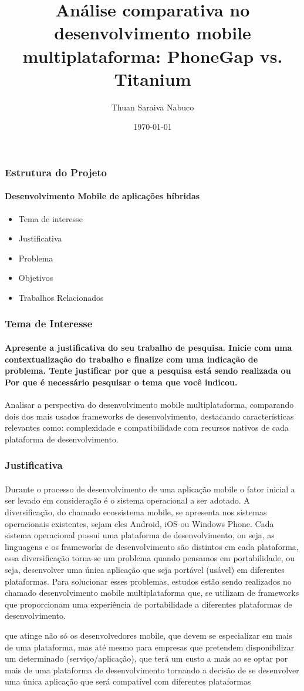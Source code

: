 \documentclass{beamer}
\title{Análise comparativa no desenvolvimento mobile multiplataforma: PhoneGap vs. Titanium}
\author{Thuan Saraiva Nabuco}
\institute{Universidade Estadual do Ceará}
\date{\today}
\begin{document}
\titlepage
\begin{frame}
	\frametitle{Estrutura do Projeto}
	\framesubtitle{Desenvolvimento Mobile de aplicações híbridas}
	\begin{itemize}
		\item Tema de interesse
		\item Justificativa
		\item Problema
		\item Objetivos
		\item Trabalhos Relacionados
	\end{itemize}
\end{frame}

\begin{frame}
	\frametitle{Tema de Interesse}
	\framesubtitle{Apresente a justificativa do seu trabalho de pesquisa. Inicie com uma contextualização do trabalho e finalize com uma indicação de problema. Tente justificar por que a pesquisa está sendo realizada ou Por que é necessário pesquisar o tema que você indicou.}
	Analisar a perspectiva do desenvolvimento mobile multiplataforma, comparando dois dos mais usados frameworks de desenvolvimento, destacando características relevantes como: complexidade e compatibilidade com recursos nativos de cada plataforma de desenvolvimento.
\end{frame}

\begin{frame}
	\frametitle{Justificativa}
	\framesubtitle{}
	Durante o processo de desenvolvimento de uma aplicação mobile o fator inicial a ser levado em consideração é o sistema operacional a ser adotado. A diversificação, do chamado ecossistema mobile, se apresenta nos sistemas operacionais existentes, sejam eles Android, iOS ou Windows Phone. Cada sistema operacional possui uma plataforma de desenvolvimento, ou seja, as linguagens e os frameworks de desenvolvimento são distintos em cada plataforma, essa diversificação torna-se um problema quando pensamos em portabilidade, ou seja, desenvolver uma única aplicação que seja portável (usável) em diferentes plataformas. Para solucionar esses problemas, estudos estão sendo realizados no chamado desenvolvimento mobile multiplataforma que, se utilizam de frameworks que proporcionam uma experiência de portabilidade a diferentes plataformas de desenvolvimento.  

	que atinge não só os desenvolvedores mobile, que devem se especializar em mais de uma plataforma, mas até mesmo para empresas que pretendem disponibilizar um determinado (serviço/aplicação), que terá um custo a mais ao se optar por mais de uma plataforma de desenvolvimento tornando a decisão de se desenvolver uma única aplicação que será compatível com diferentes plataformas
\end{frame}
\end{document}
